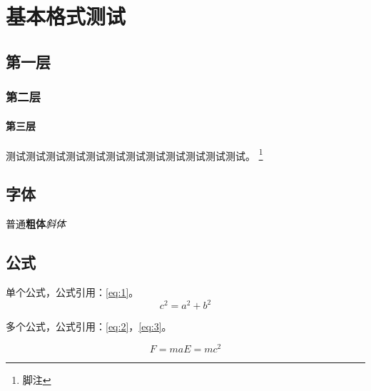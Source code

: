 

\frontmatter
\maketitle
\makeabstract
\tableofcontents
\listoffigures
\listoftables
\mainmatter

\chapter{基本格式测试}\label{chapter:1}

\section{第一层}\label{sec:1}
\subsection{第二层}\label{sec:2}
\subsubsection{第三层}\label{sec:3}
测试测试测试测试测试测试测试测试测试测试测试测试。
\footnote{\label{footnote:1}脚注}

\section{字体}

普通\textbf{粗体}\emph{斜体}


\section{公式}

单个公式，公式引用：\autoref{eq:1}。
\begin{equation}
 c^2 = a^2 + b^2 \label{eq:1}
\end{equation}

多个公式，公式引用：\autoref{eq:2}，\autoref{eq:3}。

\begin{subequations}
\begin{equation}
  F = ma \label{eq:2}
\end{equation}
\begin{equation}
  E = mc^2 \label{eq:3}
\end{equation}
\end{subequations}

